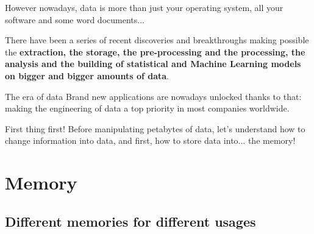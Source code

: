 \documentclass[handout]{beamer}[10pt, usepdftitle=false]
\begin{document}
	\begin{frame}	
	
	However nowadays, data is more than just your operating system, all your software and some word documents...
	\vspace*{1.0em}	
	
	There have been a series of recent discoveries and breakthroughs making possible the \textbf{extraction, the storage, the pre-processing and the processing, the analysis and the building of statistical and Machine Learning models on bigger and bigger amounts of data}. 
	\vspace*{0.6em}
	
	
	\begin{block}{The era of data}
	Brand new applications are nowadays unlocked thanks to that: making the engineering of data a top priority in most companies worldwide.
	\end{block}
	

	\begin{alertblock}{First thing first!}
	Before manipulating petabytes of data, let's understand how to change information into data, and first, how to store data into... the memory!
	\end{alertblock}			
			
    \end{frame}


\section{Memory}
	\subsection{Different memories for different usages}
	
\end{document}

